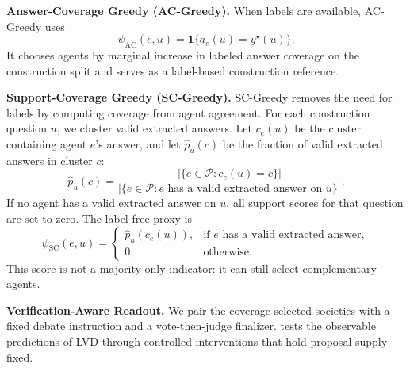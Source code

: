 \textbf{Answer-Coverage Greedy (AC-Greedy).}
When labels are available, AC-Greedy uses
\begin{equation}
    \psi_{\mathrm{AC}}(e,u)=\mathbf 1\{a_e(u)=y^\star(u)\}.
    \label{eq:answer_coverage_proxy}
\end{equation}
It chooses agents by marginal increase in labeled answer coverage on the
construction split and serves as a label-based construction reference.

\textbf{Support-Coverage Greedy (SC-Greedy).}
SC-Greedy removes the need for labels by computing coverage from agent agreement. For each
construction question $u$, we cluster valid extracted answers. Let $c_e(u)$ be
the cluster containing agent $e$'s answer, and let $\widehat p_u(c)$ be the
fraction of valid extracted answers in cluster $c$:
\[
    \widehat p_u(c)
    =
    \frac{
    |\{e\in\mathcal P:c_e(u)=c\}|
    }{
    |\{e\in\mathcal P:e\text{ has a valid extracted answer on }u\}|
    }.
\]
If no agent has a valid extracted answer on $u$, all support scores for that
question are set to zero. The label-free proxy is
\begin{equation}
    \psi_{\mathrm{SC}}(e,u)=
    \begin{cases}
    \widehat p_u(c_e(u)), & \text{if }e\text{ has a valid extracted answer},\\
    0, & \text{otherwise.}
    \end{cases}
    \label{eq:support_coverage_proxy}
\end{equation}
This score is not a majority-only indicator: it can
still select complementary agents.

\textbf{Verification-Aware Readout.}
We pair the coverage-selected societies with a fixed debate instruction and a
vote-then-judge finalizer.  tests the observable
predictions of LVD through controlled interventions that hold proposal supply
fixed.

